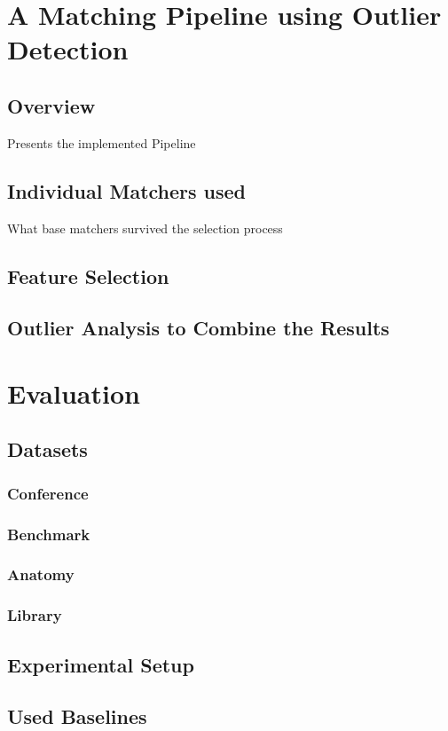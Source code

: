 \documentclass[11pt,titlepage,oneside,openany,a4paper]{report}
\begin{document}
\chapter{A Matching Pipeline using Outlier Detection}

\section{Overview}
Presents the implemented Pipeline
\section{Individual Matchers used}
What base matchers survived the selection process
\section{Feature Selection}

\section{Outlier Analysis  to Combine the Results}



\chapter{Evaluation}
\section{Datasets}
\subsection{Conference}
\subsection{Benchmark}
\subsection{Anatomy}
\subsection{Library}
\section{Experimental Setup}
\section{Used Baselines}
\end{document}
